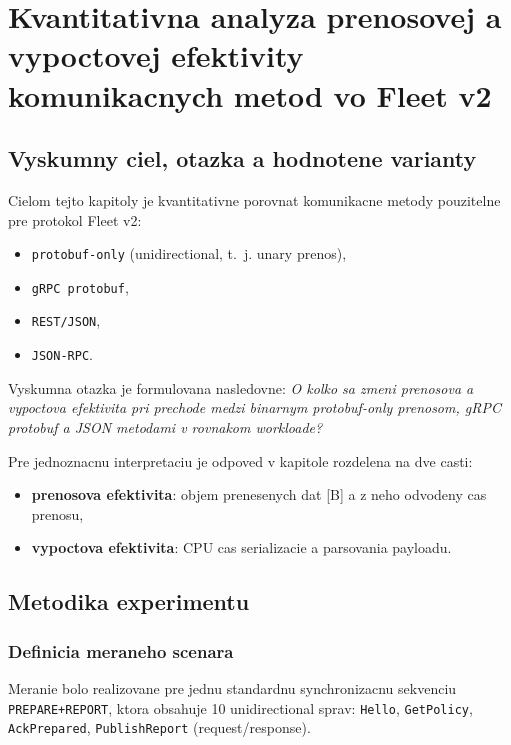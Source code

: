 \documentclass[12pt,a4paper]{report}
\begin{document}
\chapter{Kvantitativna analyza prenosovej a vypoctovej efektivity komunikacnych metod vo Fleet v2}
\label{chap:analyza-protokolov-fleet-v2}

\section{Vyskumny ciel, otazka a hodnotene varianty}

Cielom tejto kapitoly je kvantitativne porovnat komunikacne metody
pouzitelne pre protokol Fleet v2:
\begin{itemize}
  \item \texttt{protobuf-only} (unidirectional, t.~j. unary prenos),
  \item \texttt{gRPC protobuf},
  \item \texttt{REST/JSON},
  \item \texttt{JSON-RPC}.
\end{itemize}

Vyskumna otazka je formulovana nasledovne:
\textit{O kolko sa zmeni prenosova a vypoctova efektivita pri prechode
medzi binarnym protobuf-only prenosom, gRPC protobuf a JSON metodami
v rovnakom workloade?}

Pre jednoznacnu interpretaciu je odpoved v kapitole rozdelena na dve casti:
\begin{itemize}
  \item \textbf{prenosova efektivita}: objem prenesenych dat [B] a z neho odvodeny cas prenosu,
  \item \textbf{vypoctova efektivita}: CPU cas serializacie a parsovania payloadu.
\end{itemize}

\section{Metodika experimentu}

\subsection{Definicia meraneho scenara}

Meranie bolo realizovane pre jednu standardnu synchronizacnu sekvenciu
\texttt{PREPARE+REPORT}, ktora obsahuje 10 unidirectional sprav:
\texttt{Hello}, \texttt{GetPolicy},
\texttt{AckPrepared}, \texttt{PublishReport} (request/response).
\end{document}
